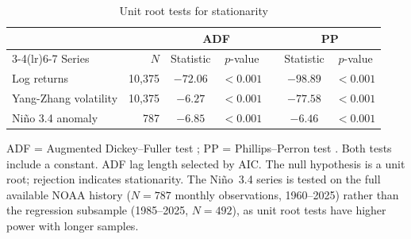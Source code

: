 \begin{table}[htbp]
\centering
\small
\caption{Unit root tests for stationarity}
\label{tab:stationarity}
\begin{tabular}{lrccrcc}
\toprule
 & & \multicolumn{2}{c}{ADF} & & \multicolumn{2}{c}{PP} \\
\cmidrule(lr){3-4}\cmidrule(lr){6-7}
Series & $N$ & Statistic & $p$-value & & Statistic & $p$-value \\
\midrule
Log returns & 10,375 & $-72.06$ & $<0.001$ & & $-98.89$ & $<0.001$ \\
Yang-Zhang volatility & 10,375 & $-6.27$ & $<0.001$ & & $-77.58$ & $<0.001$ \\
Niño 3.4 anomaly & 787 & $-6.85$ & $<0.001$ & & $-6.46$ & $<0.001$ \\
\bottomrule
\end{tabular}
\par\smallskip
{\footnotesize ADF = Augmented Dickey--Fuller test
\parencite{dickey1979distribution}; PP = Phillips--Perron test
\parencite{phillips1988testing}. Both tests include a constant.
ADF lag length selected by AIC. The null hypothesis is a unit root;
rejection indicates stationarity. The Ni\~no~3.4 series is tested on
the full available NOAA history ($N = 787$ monthly observations,
1960--2025) rather than the regression subsample (1985--2025, $N = 492$),
as unit root tests have higher power with longer samples.}
\end{table}